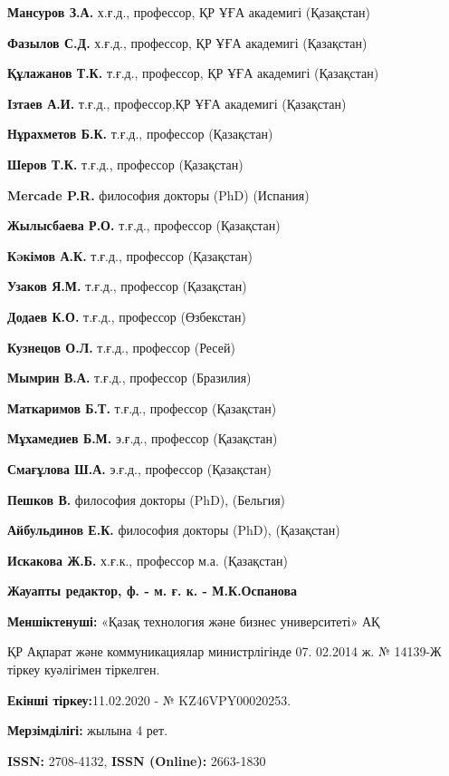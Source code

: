 {\bfseries Мансуров З.А.} х.ғ.д., профессор, ҚР ҰҒА академигі (Қазақстан)

{\bfseries Фазылов С.Д.} х.ғ.д., профессор, ҚР ҰҒА академигі (Қазақстан)

{\bfseries Құлажанов Т.К.} т.ғ.д., профессор, ҚР ҰҒА академигі (Қазақстан)

{\bfseries Ізтаев А.И.} т.ғ.д., профессор,ҚР ҰҒА академигі (Қазақстан)

{\bfseries Нұрахметов Б.К.} т.ғ.д., профессор (Қазақстан)

{\bfseries Шеров Т.К.} т.ғ.д., профессор (Қазақстан)

{\bfseries Mercade P.R.} философия докторы (PhD) (Испания)

{\bfseries Жылысбаева Р.О.} т.ғ.д., профессор (Қазақстан)

{\bfseries Кəкімов А.К.} т.ғ.д., профессор (Қазақстан)

{\bfseries Узаков Я.М.} т.ғ.д., профессор (Қазақстан)

{\bfseries Додаев К.О.} т.ғ.д., профессор (Өзбекстан)

{\bfseries Кузнецов О.Л.} т.ғ.д., профессор (Ресей)

{\bfseries Мымрин В.А.} т.ғ.д., профессор (Бразилия)

{\bfseries Маткаримов Б.Т.} т.ғ.д., профессор (Қазақстан)

{\bfseries Мұхамедиев Б.М.} э.ғ.д., профессор (Қазақстан)

{\bfseries Смағұлова Ш.А.} э.ғ.д., профессор (Қазақстан)

{\bfseries Пешков В.} философия докторы (PhD), (Бельгия)

{\bfseries Айбульдинов Е.К.} философия докторы (PhD), (Қазақстан)

{\bfseries Искакова Ж.Б.} х.ғ.к., профессор м.а. (Қазақстан)

\begin{center}
{\bfseries Жауапты редактор, ф. - м. ғ. к. - М.К.Оспанова}
\end{center}

{\bfseries Меншіктенуші:} «Қазақ технология және бизнес университеті» АҚ

ҚР Ақпарат және коммуникациялар министрлігінде 07. 02.2014 ж. № 14139-Ж
тіркеу куәлігімен тіркелген.

{\bfseries Екінші тіркеу:}11.02.2020 - № KZ46VPY00020253.

{\bfseries Мерзімділігі:} жылына 4 рет.

{\bfseries ISSN:} 2708-4132, {\bfseries ISSN (Online):} 2663-1830

